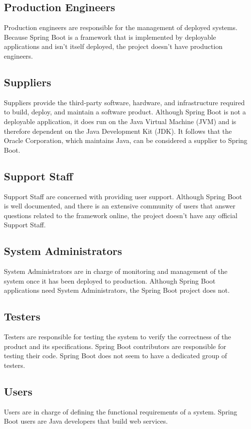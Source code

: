\subsection*{Production Engineers}
Production engineers are responsible for the management of deployed systems. Because Spring Boot is a framework that is implemented by deployable applications and isn't itself deployed, the project doesn't have production engineers.

\subsection*{Suppliers}
Suppliers provide the third-party software, hardware, and infrastructure required to build, deploy, and maintain a software product. Although Spring Boot is not a deployable application, it does run on the Java Virtual Machine (JVM) and is therefore dependent on the Java Development Kit (JDK). It follows that the Oracle Corporation, which maintains Java, can be considered a supplier to Spring Boot.

\subsection*{Support Staff}
Support Staff are concerned with providing user support. Although Spring Boot is well documented, and there is an extensive community of users that answer questions related to the framework online, the project doesn't have any official Support Staff.

\subsection*{System Administrators}
System Administrators are in charge of monitoring and management of the system once it has been deployed to production. Although Spring Boot applications need System Administrators, the Spring Boot project does not.

\subsection*{Testers}
Testers are responsible for testing the system to verify the correctness of the product and its specifications. Spring Boot contributors are responsible for testing their code. Spring Boot does not seem to have a dedicated group of testers.

\subsection*{Users}
Users are in charge of defining the functional requirements of a system. Spring Boot users are Java developers that build web services.